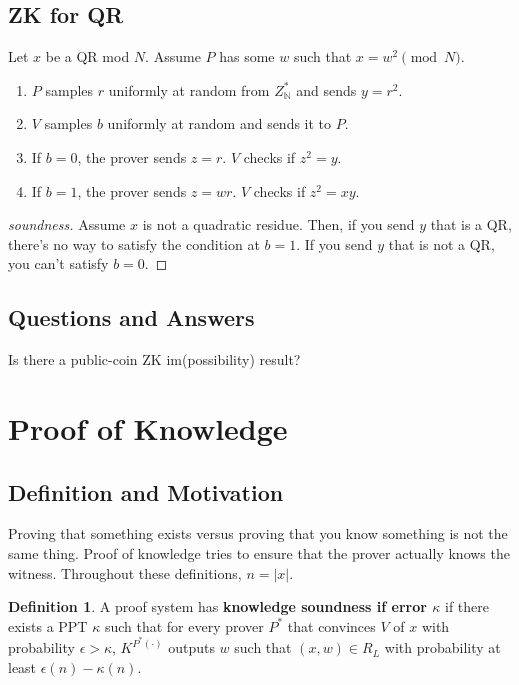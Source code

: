 \documentclass{article}
\theoremstyle{definition}
\newtheorem{definition}{Definition}
\newcommand{\N}{\mathbb{N}}
\begin{document}
\subsection{ZK for QR}

Let $x$ be a QR mod $N$. Assume $P$ has some $w$ such that $x = w^{2} \pmod{N}$.

\begin{enumerate}
    \item $P$ samples $r$ uniformly at random from $Z^{*}_{\N}$ and sends $y = r^{2}$.
    \item $V$ samples $b$ uniformly at random and sends it to $P$.
    \item If $b = 0$, the prover sends $z = r$. $V$ checks if $z^{2} = y$.
    \item If $b = 1$, the prover sends $z = wr$. $V$ checks if $z^{2} = xy$.
\end{enumerate}

\begin{proof}[soundness]
    Assume $x$ is not a quadratic residue. Then, if you send $y$ that is a QR, there's no
    way to satisfy the condition at $b = 1$. If you send $y$ that is not a QR, you can't satisfy
    $b = 0$.
\end{proof}

\subsection{Questions and Answers}

Is there a public-coin ZK im(possibility) result?

\newpage 

\section{Proof of Knowledge}

\subsection{Definition and Motivation}

Proving that something exists versus proving that you know something is not the same thing. Proof
of knowledge tries to ensure that the prover actually knows the witness. Throughout these definitions,
$n = \lvert x \rvert$. 

\begin{definition}
    A proof system has \textbf{knowledge soundness if error $\kappa$} if there exists
    a PPT $\kappa$ such that for every prover $P^{*}$ that convinces $V$ of $x$ with 
    probability $\epsilon > \kappa$, $K^{P^{*}(\cdot)}$ outputs $w$ such that
    $(x,w) \in R_{L}$ with probability at least $\epsilon(n) - \kappa(n)$.
\end{definition}
\end{document}
